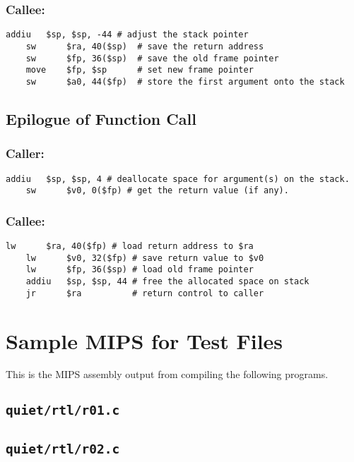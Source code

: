 \documentclass[a4paper,11pt]{article}
\begin{document}
\subsubsection*{Callee:}
\begin{lstlisting}[breakindent=29\ttCharWidth]
    addiu   $sp, $sp, -44 # adjust the stack pointer
    sw      $ra, 40($sp)  # save the return address
    sw      $fp, 36($sp)  # save the old frame pointer
    move    $fp, $sp      # set new frame pointer
    sw      $a0, 44($fp)  # store the first argument onto the stack
\end{lstlisting}

\subsection{Epilogue of Function Call}
\subsubsection*{Caller:}
\begin{lstlisting}[breakindent=27\ttCharWidth]
    addiu   $sp, $sp, 4 # deallocate space for argument(s) on the stack.
    sw      $v0, 0($fp) # get the return value (if any).
\end{lstlisting}

\subsubsection*{Callee:}
\begin{lstlisting}[breakindent=28\ttCharWidth]
    lw      $ra, 40($fp) # load return address to $ra
    lw      $v0, 32($fp) # save return value to $v0
    lw      $fp, 36($sp) # load old frame pointer
    addiu   $sp, $sp, 44 # free the allocated space on stack
    jr      $ra          # return control to caller
\end{lstlisting}

\section{Sample MIPS for Test Files}
This is the MIPS assembly output from compiling the following programs.

\subsection{\texttt{quiet/rtl/r01.c}} 
\subsection{\texttt{quiet/rtl/r02.c}} 
\end{document}
